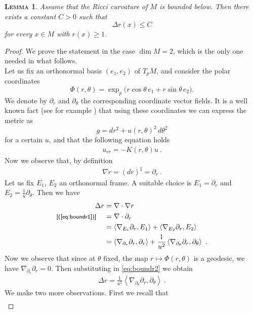 \documentclass[a4paper,11pt,openright,twoside]{book}
\newcommand{\1}{\mathds{1}}
\newcommand{\commb}[1]{\textsf{{\footnotesize[#1]}}}
\newcommand{\qref}[1]{(\ref{#1})}
\theoremstyle{plain}
\newtheorem{lemma}[thm]{\textsc{Lemma}}
\theoremstyle{definition}
\theoremstyle{remark}
\begin{document}
\begin{lemma}\label{lm:distest}
Assume that the Ricci curvature of $M$ is bounded below. Then there exists a constant $C>0$ such that
\[
\Delta r(x)\leq C
\]
for every $x\in M$ with $r(x)\geq 1$.
\end{lemma}
\begin{proof}
We prove the statement in the case $\dim M=2$, which is the only one needed in what follows. \\
Let us fix an orthonormal basis $(e_1,e_2)$ of $T_pM$, and consider the polar coordinates
\[
\Phi(r,\theta)=\exp_p\bigl(r\cos\theta\,e_1+r\sin\theta\,e_2\bigr).
\]
We denote by $\partial_r$ and $\partial_\theta$ the corresponding coordinate vector fields. It is a well known fact (see for example \cite{do_carmo_2016}) that using these coordinates we can express the metric as 
\[
g = dr^2 +u(r,\theta)^2\, d\theta^2
\]
for a certain $u$, and that the following equation holds
\begin{align}\label{eq:boundr0}
	u_{rr} = -K(r,\theta) u\ .
\end{align}
Now we observe that, by definition 
\begin{align}\label{eq:boundr1}
	\nabla r = \left( dr \right)^\sharp = \partial_r
\ . 
\end{align}
Let us fix $E_1$, $E_2$ an orthonormal frame. A suitable choice is $E_1 = \partial_r$ and $E_2 = \frac{1}{u} \partial_\theta$.
Then we have
\begin{align}\label{eq:boundr2}
	\Delta r &= \nabla\cdot \nabla r\notag\\
	\commb{\qref{eq:boundr1}}\hspace{4mm}&=  \nabla\cdot \partial_r \notag\\
	&=  \left< \nabla_{E_1} \partial_r, E_1 \right> + \left< \nabla_{E_2}\partial_r, E_2 \right> \notag\\
	&=  \left<\nabla_{\partial_r}\partial_r,\partial_r \right> + \frac{1}{u^2} \left<\nabla_{\partial_\theta} \partial_r, \partial_\theta \right> 
\ . 
\end{align}
Now we observe that since at $\theta$ fixed, the map  $r \mapsto \Phi(r,\theta)$ is a geodesic, we have $\nabla_{\partial_r}\partial_r = 0$. Then substituting in \eqref{eq:boundr2} we obtain
\begin{align}\label{eq:boundr3}
	\Delta r = \frac{1}{u^2}\left< \nabla_{\partial_\theta}\partial_r,\partial_\theta \right>
\ . 
\end{align}
We make two more observations. First we recall that
\begin{align*}

\end{align*}
\end{proof}
\end{document}
